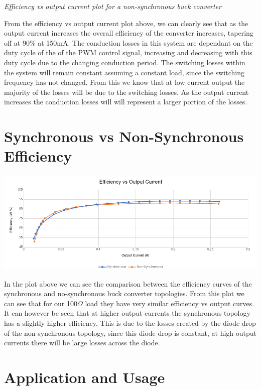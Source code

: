 \documentclass[a4paper,11pt]{article}
\begin{document}
\begin{preview}
\begin{center}
    \textit{Efficiency vs output current plot for a non-synchronous buck converter}
  \end{center}

  From the efficiency vs output current plot above, we can clearly see that as the output current increases the overall efficiency of the converter increases, tapering off at 90\% at 150mA. The conduction losses in this system are dependant on the duty cycle of the of the PWM control signal, increasing and decreasing with this duty cycle due to the changing conduction period. The switching losses within the system will remain constant assuming a constant load, since the switching frequency has not changed. From this we know that at low current output the majority of the losses will be due to the switching losses. As the output current increases the conduction losses will will represent a larger portion of the losses. 
 
\section{Synchronous vs Non-Synchronous Efficiency}
  

  \begin{center}
    \includegraphics[width=\textwidth]{sync_vs_non-sync.png}
  \end{center}

  In the plot above we can see the comparison between the efficiency curves of the synchronous and no-synchronous buck converter topologies. From this plot we can see that for our 100$\Omega$ load they have very similar efficiency vs output curves. It can however be seen that at higher output currents the synchronous topology has a slightly higher efficiency. This is due to the losses created by the diode drop of the non-synchronous topology, since this diode drop is constant, at high output currents there will be large losses across the diode. 


\section{Application and Usage}


\end{preview}
\end{document}
